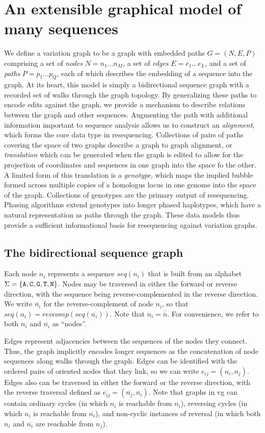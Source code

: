 \section{An extensible graphical model of many sequences}

We define a variation graph to be a graph with embedded paths $G = (N, E, P)$ comprising a set of \emph{nodes} $N = n_1 \ldots n_M$, a set of \emph{edges} $E = e_1 \ldots e_L$, and a set of \emph{paths} $P = p_1 \ldots p_Q$, each of which describes the embedding of a sequence into the graph.
At its heart, this model is simply a bidirectional sequence graph with a recorded set of walks through the graph topology.
By generalizing these paths to encode edits against the graph, we provide a mechanism to describe relations between the graph and other sequences.
Augmenting the path with additional information important to sequence analysis allows us to construct an \emph{alignment}, which forms the core data type in resequencing.
Collections of pairs of paths covering the space of two graphs describe a graph to graph alignment, or \emph{translation} which can be generated when the graph is edited to allow for the projection of coordinates and sequences in one graph into the space fo the other.
A limited form of this translation is a \emph{genotype}, which maps the implied bubble formed across multiple copies of a homologus locus in one genome into the space of the graph.
Collections of genotypes are the primary output of resequencing.
Phasing algorithms extend genotypes into longer phased haplotypes, which have a natural representation as paths through the graph.
These data models thus provide a sufficient informational basis for resequencing against variation graphs.

\subsection{The bidirectional sequence graph}

Each node $n_i$ represents a sequence $seq(n_i)$ that is built from an alphabet $\Sigma = \{ {\tt A, C, G, T, N} \}$. Nodes may be traversed in either the forward or reverse direction, with the sequence being reverse-complemented in the reverse direction.
We write $\overline{n_i}$ for the reverse-complement of node $n_i$, so that $seq(n_i) = revcomp(seq(\overline{n_i}))$.
Note that $n_i = \overline{\overline{n}}$. For convenience, we refer to both $n_i$ and $\overline{n_i}$ as ``nodes''.

Edges represent adjacencies between the sequences of the nodes they connect.
Thus, the graph implicitly encodes longer sequences as the concatenation of node sequences along walks through the graph.
Edges can be identified with the ordered pairs of oriented nodes that they link, so we can write $e_{ij} = (n_i,n_j)$.
Edges also can be traversed in either the forward or the reverse direction, with the reverse traversal defined as $\overline{e_{ij}} = (\overline{n_j},\overline{n_i})$.
Note that graphs in vg can contain ordinary cycles (in which $n_i$ is reachable from $n_i$), reversing cycles (in which $n_i$ is reachable from $\overline{n_i}$), and non-cyclic instances of reversal (in which both $n_i$ and $\overline{n_i}$ are reachable from $n_j$).

